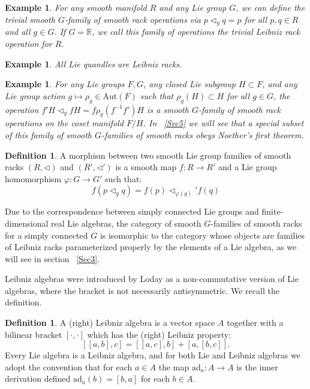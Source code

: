 \documentclass[12pt]{amsart}
\theoremstyle{plain}
\newtheorem{example}[theorem]{Example}
\theoremstyle{definition}
\newtheorem{definition}[theorem]{Definition}
\begin{document}
\begin{example}
    For any smooth manifold $R$ and any Lie group $G$, we can define the trivial smooth $G$-family of smooth rack operations via $p \triangleleft_g q=p$ for all $p,q \in R$ and all $g \in G$. If $G  =\mathbb{R}$, we call this family of operations the trivial Leibniz rack operation for $R$.
\end{example}

\begin{example}
    All Lie quandles are Leibniz racks.
\end{example}


\begin{example}
    For any Lie groups $F,G$, any closed Lie subgroup $H \subset F$, and any Lie group action $g \mapsto \rho_g \in \text{Aut}(F)$ such that $\rho_g(H) \subset H$ for all $g \in G$, the operation $f'H \triangleleft_g fH = f\rho_g(f^{-1}f')H$ is a smooth $G$-family of smooth rack operations on the coset manifold $F/H$. In ~\ref{Sec5} we will see that a special subset of this family of smooth $G$-families of smooth racks obeys Noether's first theorem.
\end{example}


\vspace{5mm}

\begin{definition}
    A morphism between two smooth Lie group families of smooth racks $(R,\triangleleft)$ and $(R',\triangleleft')$ is a smooth map $f:R\to R'$ and a Lie group homomorphism $\varphi:G \to G'$ such that:
    $$ f(p \triangleleft_g q) = f(p) \triangleleft_{\varphi(g)}'f(q) $$
\end{definition}

\vspace{5mm}


Due to the correspondence between simply connected Lie groups and finite-dimensional real Lie algebras, the category of smooth $G$-families of smooth racks for a simply connected $G$ is isomorphic to the category whose objects are families of Leibniz racks parameterized properly by the elements of a Lie algebra, as we will see in section ~\ref{Sec3}. 

 \vspace{5mm}

 Leibniz algebras were introduced by Loday \cite{Loday} as a non-commutative version of Lie algebras, where the bracket is not necessarily antisymmetric.  We recall the definition.

\begin{definition}    
A (right) Leibniz algebra is a vector space $A$ together with a bilinear bracket $[\cdot,\cdot]$ which has the (right) Leibniz property:
$$ [[a,b],c] = [[a,c],b]+[a,[b,c]]. $$
Every Lie algebra is a Leibniz algebra, and for both Lie and Leibniz algebras we adopt the convention that for each $a \in A$ the map $\text{ad}_a:A \to A$ is the inner derivation defined $\text{ad}_a(b) = [b,a]$ for each $b \in A$.
\end{definition}
\end{document}
